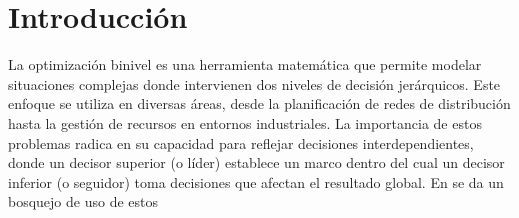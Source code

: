 \chapter{Introducción}
La optimización binivel es una herramienta matemática que permite modelar situaciones complejas donde intervienen dos niveles de decisión jerárquicos. Este enfoque se utiliza en diversas áreas, desde la planificación de redes de distribución hasta la gestión de recursos en entornos industriales. La importancia de estos problemas radica en su capacidad para reflejar decisiones interdependientes, donde un decisor superior (o líder) establece un marco dentro del cual un decisor inferior (o seguidor) toma decisiones que afectan el resultado global.
En \cite{ramos2016} se da un bosquejo de uso de estos 